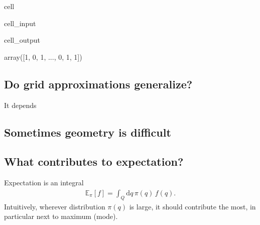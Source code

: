 \documentclass[letterpaper,10pt,english]{jupyterBook}
\begin{document}
\begin{sphinxuseclass}{cell}\begin{sphinxVerbatimInput}

\begin{sphinxuseclass}{cell_input}
\begin{sphinxVerbatim}[commandchars=\\\{\}]
\end{sphinxVerbatim}

\end{sphinxuseclass}\end{sphinxVerbatimInput}
\begin{sphinxVerbatimOutput}

\begin{sphinxuseclass}{cell_output}
\begin{sphinxVerbatim}[commandchars=\\\{\}]
array([1, 0, 1, ..., 0, 1, 1])
\end{sphinxVerbatim}

\end{sphinxuseclass}\end{sphinxVerbatimOutput}

\end{sphinxuseclass}

\subsection{Do grid approximations generalize?}
\label{\detokenize{Lecture 3:do-grid-approximations-generalize}}
\sphinxAtStartPar
It depends






\subsection{Sometimes geometry is difficult}
\label{\detokenize{Lecture 3:sometimes-geometry-is-difficult}}





\subsection{What contributes to expectation?}
\label{\detokenize{Lecture 3:what-contributes-to-expectation}}
\sphinxAtStartPar
Expectation is an integral
\begin{equation*}
\begin{split}
\mathbb{E}_{\pi}[f] = \int_{Q} \mathrm{d} q \, \pi(q) \, f(q).
\end{split}
\end{equation*}
\sphinxAtStartPar
Intuitively, wherever distribution \(\pi(q)\) is large, it should contribute the most, in particular next to maximum (mode).
\end{document}
